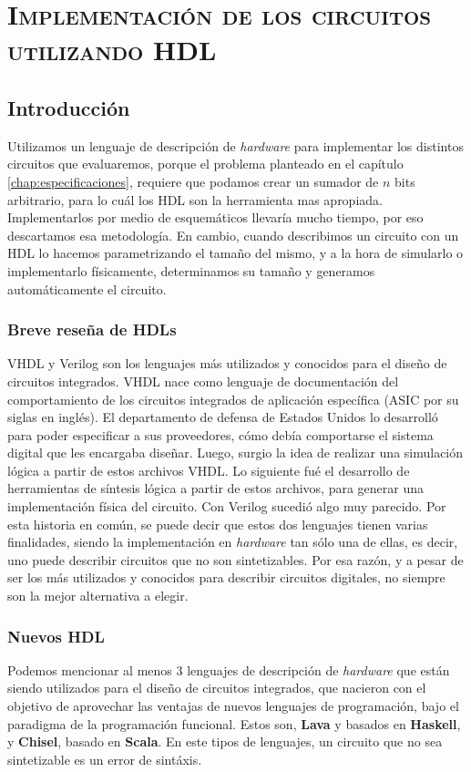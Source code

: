\chapter{\textsc{Implementación de los circuitos utilizando HDL} }\label{implementaciónHDL}
\section{Introducción}
Utilizamos un lenguaje de descripción de \emph{hardware} para implementar los distintos circuitos que evaluaremos, porque el problema planteado en el capítulo \ref{chap:especificaciones}, requiere que podamos crear un sumador de $n$ bits arbitrario, para lo cuál los HDL son la herramienta mas apropiada. Implementarlos por medio de esquemáticos llevaría mucho tiempo, por eso descartamos esa metodología. En cambio, cuando describimos un circuito con un HDL lo hacemos parametrizando el tamaño del mismo, y a la hora de simularlo o implementarlo físicamente, determinamos su tamaño y generamos automáticamente el circuito. 

\subsection{Breve reseña de HDLs}
VHDL y Verilog son los lenguajes más utilizados y conocidos para el diseño de circuitos integrados. VHDL nace como lenguaje de documentación del comportamiento de los circuitos integrados de aplicación específica (ASIC por su siglas en inglés). El departamento de defensa de Estados Unidos lo desarrolló para poder especificar a sus proveedores, cómo debía comportarse el sistema digital que les encargaba diseñar. Luego, surgio la idea de realizar una simulación lógica a partir de estos archivos VHDL. Lo siguiente fué el desarrollo de herramientas de síntesis lógica a partir de estos archivos, para generar una implementación física del circuito. Con Verilog sucedió algo muy parecido. Por esta historia en común, se puede decir que estos dos lenguajes tienen varias finalidades, siendo la implementación en \emph{hardware} tan sólo una de ellas, es decir, uno puede describir circuitos que no son sintetizables. Por esa razón, y a pesar de ser los más utilizados y conocidos para describir circuitos digitales, no siempre son la mejor alternativa a elegir.

\subsection{Nuevos HDL}\label{subsec:nuevosHDL}
Podemos mencionar al menos 3 lenguajes de descripción de \emph{hardware} que están siendo utilizados para el diseño de circuitos integrados, que nacieron con el objetivo de aprovechar las ventajas de nuevos lenguajes de programación, bajo el paradigma de la programación funcional. Estos son, \textbf{Lava}\cite{Lava} y \cite{Clash} basados en \textbf{Haskell}, y \textbf{Chisel}\cite{Chisel}, basado en \textbf{Scala}. En este tipos de lenguajes, un circuito que no sea sintetizable es un error de sintáxis. 

